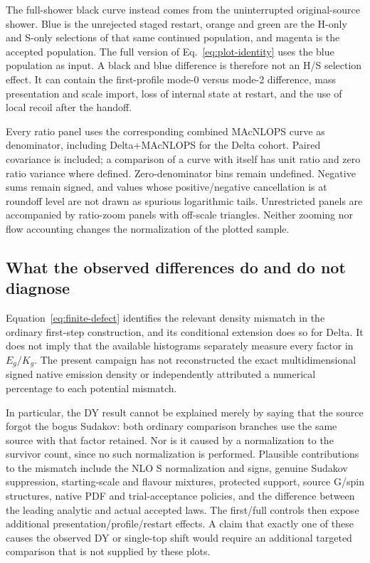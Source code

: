 The full-shower black curve instead comes from the uninterrupted
original-source shower. Blue is the unrejected staged restart, orange
and green are the H-only and S-only selections of that same continued
population, and magenta is the accepted population. The full version of
Eq.~\eqref{eq:plot-identity} uses the blue population as input. A black
and blue difference is therefore not an H/S selection effect. It can
contain the first-profile mode-0 versus mode-2 difference, mass
presentation and scale import, loss of internal state at restart, and
the use of local recoil after the handoff.

Every ratio panel uses the corresponding combined MAcNLOPS curve as
denominator, including Delta+MAcNLOPS for the Delta cohort. Paired
covariance is included; a comparison of a curve with itself has unit
ratio and zero ratio variance where defined. Zero-denominator bins
remain undefined. Negative sums remain signed, and values whose
positive/negative cancellation is at roundoff level are not drawn as
spurious logarithmic tails. Unrestricted panels are accompanied by
ratio-zoom panels with off-scale triangles. Neither zooming nor flow
accounting changes the normalization of the plotted sample.

\subsection{What the observed differences do and do not diagnose}
Equation~\eqref{eq:finite-defect} identifies the relevant density mismatch
in the ordinary first-step construction, and its conditional extension
does so for Delta. It does not imply that the available histograms
separately measure every factor in $E_g/K_g$. The present campaign has
not reconstructed the exact multidimensional signed native emission
density or independently attributed a numerical percentage to each
potential mismatch.

In particular, the DY result cannot be explained merely by saying that
the source forgot the bogus Sudakov: both ordinary comparison branches
use the same source with that factor retained. Nor is it caused by a
normalization to the survivor count, since no such normalization is
performed. Plausible contributions to the mismatch include the NLO S
normalization and signs, genuine Sudakov suppression, starting-scale and
flavour mixtures, protected support, source G/spin structures, native PDF
and trial-acceptance policies, and the difference between the leading
analytic and actual accepted laws. The first/full controls then expose
additional presentation/profile/restart effects. A claim that exactly
one of these causes the observed DY or single-top shift would require
an additional targeted comparison that is not supplied by these plots.

